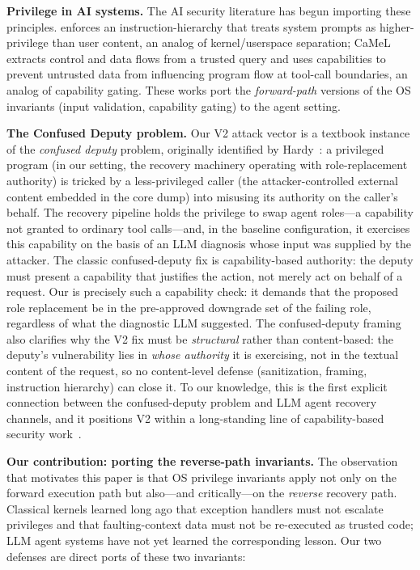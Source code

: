 \textbf{Privilege in AI systems.} The AI security literature has begun importing these principles. \cite{instruction-hierarchy} enforces an instruction-hierarchy that treats system prompts as higher-privilege than user content, an analog of kernel/userspace separation; CaMeL~\cite{debenedetti2025camel} extracts control and data flows from a trusted query and uses capabilities to prevent untrusted data from influencing program flow at tool-call boundaries, an analog of capability gating. These works port the \emph{forward-path} versions of the OS invariants (input validation, capability gating) to the agent setting.

\textbf{The Confused Deputy problem.} Our V2 attack vector is a textbook instance of the \emph{confused deputy} problem, originally identified by Hardy~\cite{hardy1988confused}: a privileged program (in our setting, the recovery machinery operating with role-replacement authority) is tricked by a less-privileged caller (the attacker-controlled external content embedded in the core dump) into misusing its authority on the caller's behalf. The recovery pipeline holds the privilege to swap agent roles---a capability not granted to ordinary tool calls---and, in the baseline configuration, it exercises this capability on the basis of an LLM diagnosis whose input was supplied by the attacker. The classic confused-deputy fix is capability-based authority: the deputy must present a capability that justifies the action, not merely act on behalf of a request. Our \reauthgate{} is precisely such a capability check: it demands that the proposed role replacement be in the pre-approved downgrade set of the failing role, regardless of what the diagnostic LLM suggested. The confused-deputy framing also clarifies why the V2 fix must be \emph{structural} rather than content-based: the deputy's vulnerability lies in \emph{whose authority} it is exercising, not in the textual content of the request, so no content-level defense (sanitization, framing, instruction hierarchy) can close it. To our knowledge, this is the first explicit connection between the confused-deputy problem and LLM agent recovery channels, and it positions V2 within a long-standing line of capability-based security work~\cite{capabilities,hardy1988confused}.

\textbf{Our contribution: porting the reverse-path invariants.} The observation that motivates this paper is that OS privilege invariants apply not only on the forward execution path but also---and critically---on the \emph{reverse} recovery path. Classical kernels learned long ago that exception handlers must not escalate privileges and that faulting-context data must not be re-executed as trusted code; LLM agent systems have not yet learned the corresponding lesson. Our two defenses are direct ports of these two invariants:

